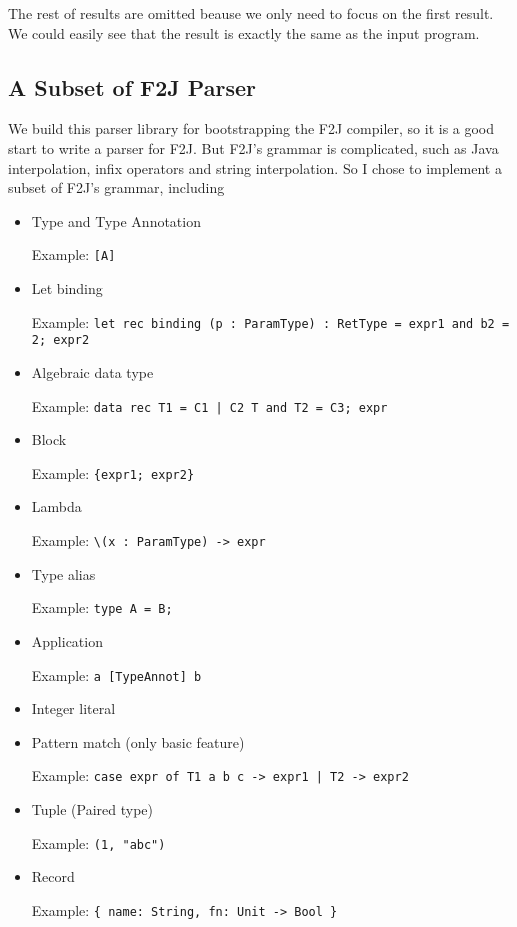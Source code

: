 The rest of results are omitted beause we only need to focus on the first result. We could easily see that the result is exactly the same as the input program.

\subsection{A Subset of F2J Parser}

We build this parser library for bootstrapping the F2J compiler, so it is a good start to write a parser for F2J. But F2J's grammar is complicated, such as Java interpolation, infix operators and string interpolation. So I chose to implement a subset of F2J's grammar, including

\begin{itemize}
\item Type and Type Annotation

Example: \texttt{[A]}

\item Let binding

Example: \texttt{let rec binding (p : ParamType) : RetType = expr1 and b2 = 2; expr2}

\item Algebraic data type

Example: \texttt{data rec T1 = C1 | C2 T and T2 = C3; expr}

\item Block

Example: \texttt{\{expr1; expr2\}}

\item Lambda

Example: \texttt{\textbackslash (x : ParamType) -> expr}

\item Type alias

Example: \texttt{type A = B;}

\item Application

Example: \texttt{a [TypeAnnot] b}

\item Integer literal
\item Pattern match (only basic feature)

Example: \texttt{case expr of T1 a b c -> expr1 | T2 -> expr2}

\item Tuple (Paired type)

Example: \texttt{(1, "abc")}

\item Record

Example: \texttt{\{ name: String, fn: Unit -> Bool \}}

\end{itemize}

